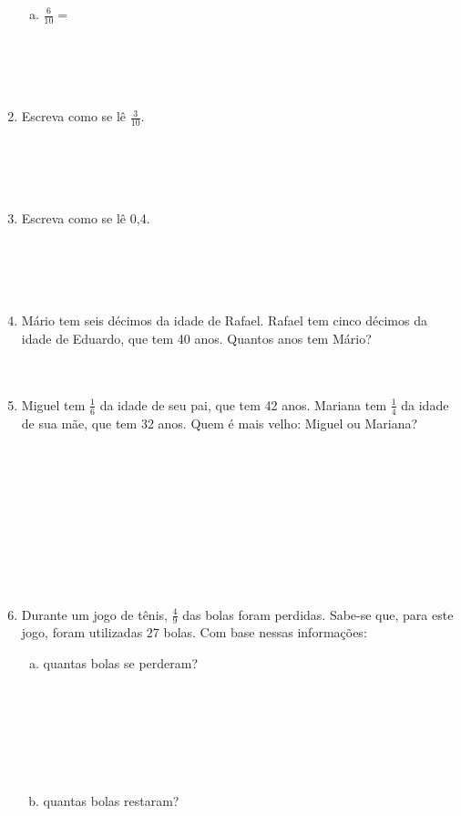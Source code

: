 \documentclass[a4paper,14pt]{article}
\begin{document}
\begin{multicols}{2}
\begin{enumerate}
\begin{enumerate}[a)]
				\item $\frac{6}{10} = $ \\\\\\\\\\
			\end{enumerate}
			\item Escreva como se lê $\frac{3}{10}$. \\\\\\\\\\
			\item Escreva como se lê 0,4. \\\\\\\\\\
			\item Mário tem seis décimos da idade de Rafael. Rafael tem cinco décimos da idade de Eduardo, que tem 40 anos. Quantos anos tem Mário? \\\\\\
			\item Miguel tem $\frac{1}{6}$ da idade de seu pai, que tem 42 anos. Mariana tem $\frac{1}{4}$ da idade de sua mãe, que tem 32 anos. Quem é mais velho: Miguel ou Mariana? \\\\\\\\\\\\\\\\\\\\
			\item Durante um jogo de tênis, $\frac{4}{9}$ das bolas foram perdidas. Sabe-se que, para este jogo, foram utilizadas 27 bolas. Com base nessas informações:
			\begin{enumerate}[a)]
				\item quantas bolas se perderam? \\\\\\\\\\\\\\
				\item quantas bolas restaram? \\\\\\\\\\\\\\

\end{enumerate}
\end{enumerate}
\end{multicols}
\end{document}
